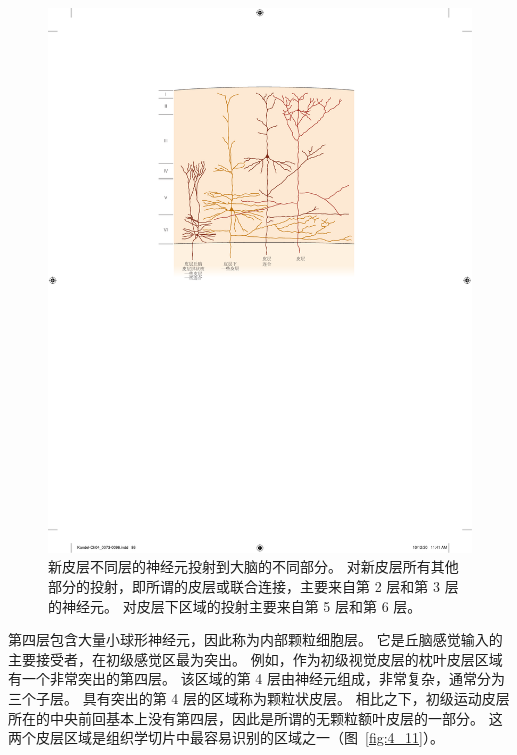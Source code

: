 \begin{figure}[htbp]
	\centering
	\includegraphics[width=0.8\linewidth]{chap04/fig_4_10}
	\caption{新皮层不同层的神经元投射到大脑的不同部分。
		对新皮层所有其他部分的投射，即所谓的皮层或联合连接，主要来自第 2 层和第 3 层的神经元。
		对皮层下区域的投射主要来自第 5 层和第 6 层\cite{jones1986connectivity}。}
	\label{fig:4_10}
\end{figure}


第四层包含大量小球形神经元，因此称为内部颗粒细胞层。 
它是丘脑感觉输入的主要接受者，在初级感觉区最为突出。 
例如，作为初级视觉皮层的枕叶皮层区域有一个非常突出的第四层。 
该区域的第 4 层由神经元组成，非常复杂，通常分为三个子层。 
具有突出的第 4 层的区域称为颗粒状皮层。 
相比之下，初级运动皮层所在的中央前回基本上没有第四层，因此是所谓的无颗粒额叶皮层的一部分。 
这两个皮层区域是组织学切片中最容易识别的区域之一（图~\ref{fig:4_11}）。

